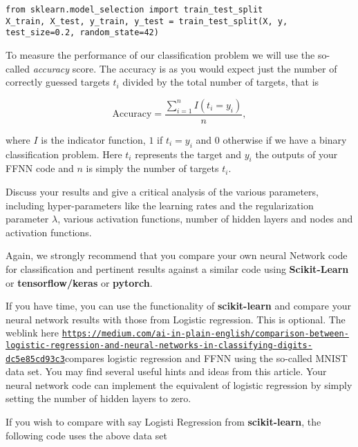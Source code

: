 \documentclass[%
oneside,                 %
final,                   %
10pt]{article}
\begin{document}
\begin{verbatim}
from sklearn.model_selection import train_test_split
X_train, X_test, y_train, y_test = train_test_split(X, y, test_size=0.2, random_state=42)

\end{verbatim}


To measure the performance of our classification problem we will use the
so-called \emph{accuracy} score.  The accuracy is as you would expect just
the number of correctly guessed targets $t_i$ divided by the total
number of targets, that is 

\[ 
\text{Accuracy} = \frac{\sum_{i=1}^n I(t_i = y_i)}{n} ,
\]

where $I$ is the indicator function, $1$ if $t_i = y_i$ and $0$
otherwise if we have a binary classification problem. Here $t_i$
represents the target and $y_i$ the outputs of your FFNN code and $n$ is simply the number of targets $t_i$.

Discuss your results and give a critical analysis of the various parameters, including hyper-parameters like the learning rates and the regularization parameter $\lambda$, various activation functions, number of hidden layers and nodes and activation functions.  

Again, we strongly recommend that you compare your own neural Network
code for classification and pertinent results against a similar code using \textbf{Scikit-Learn}  or \textbf{tensorflow/keras} or \textbf{pytorch}.

If you have time, you can use the functionality of \textbf{scikit-learn} and compare your neural network results with those from Logistic regression. This is optional.
The weblink  here \href{{https://medium.com/ai-in-plain-english/comparison-between-logistic-regression-and-neural-networks-in-classifying-digits-dc5e85cd93c3}}{\nolinkurl{https://medium.com/ai-in-plain-english/comparison-between-logistic-regression-and-neural-networks-in-classifying-digits-dc5e85cd93c3}}compares logistic regression and FFNN using the so-called MNIST data set. You may find several useful hints and ideas from this article. Your neural network code can implement the equivalent of logistic regression by simply setting the number of hidden layers to zero. 

If you wish to compare with say Logisti Regression from \textbf{scikit-learn}, the following code uses the above data set
\end{document}
